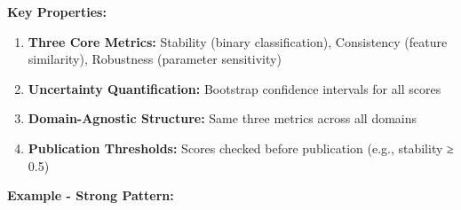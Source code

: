 \documentclass[
]{article}
\providecommand{\tightlist}{%
  \setlength{\itemsep}{0pt}\setlength{\parskip}{0pt}}
\begin{document}
\textbf{Key Properties:}

\begin{enumerate}
\def\labelenumi{\arabic{enumi}.}
\tightlist
\item
  \textbf{Three Core Metrics:} Stability (binary classification),
  Consistency (feature similarity), Robustness (parameter sensitivity)
\item
  \textbf{Uncertainty Quantification:} Bootstrap confidence intervals
  for all scores
\item
  \textbf{Domain-Agnostic Structure:} Same three metrics across all
  domains
\item
  \textbf{Publication Thresholds:} Scores checked before publication
  (e.g., stability ≥ 0.5)
\end{enumerate}

\textbf{Example - Strong Pattern:}
\end{document}
